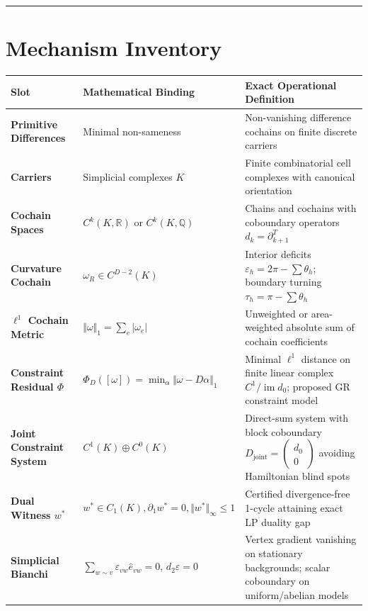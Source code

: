 \documentclass[11pt]{article}
\begin{document}
\medskip\hrule\medskip
\section{\texorpdfstring{Mechanism Inventory}{Mechanism Inventory}}

\begin{small}
\begin{longtable}{>{\raggedright\arraybackslash}p{}>{\raggedright\arraybackslash}p{}>{\raggedright\arraybackslash}p{}}
\toprule
Slot & Mathematical Binding & Exact Operational Definition \\
\midrule
\textbf{Primitive Differences} & Minimal non-sameness & Non-vanishing difference cochains on finite discrete carriers \\
\addlinespace[0.25em]
\textbf{Carriers} & Simplicial complexes $K$ & Finite combinatorial cell complexes with canonical orientation \\
\addlinespace[0.25em]
\textbf{Cochain Spaces} & $C^k(K, \mathbb{R})$ or $C^k(K, \mathbb{Q})$ & Chains and cochains with coboundary operators $d_k = \partial_{k+1}^T$ \\
\addlinespace[0.25em]
\textbf{Curvature Cochain} & $\omega_R \in C^{D-2}(K)$ & Interior deficits $\varepsilon_h = 2\pi - \sum \theta_h$; boundary turning $\tau_h = \pi - \sum \theta_h$ \\
\addlinespace[0.25em]
\textbf{$\ell^1$ Cochain Metric} & $\Vert \omega \Vert_1 = \sum_e \lvert \omega_e \rvert$ & Unweighted or area-weighted absolute sum of cochain coefficients \\
\addlinespace[0.25em]
\textbf{Constraint Residual $\Phi$} & $\Phi_D([\omega]) = \min_{\alpha} \Vert \omega - D \alpha \Vert_1$ & Minimal $\ell^1$ distance on finite linear complex $C^1 / \operatorname{im} d_0$; proposed GR constraint model \\
\addlinespace[0.25em]
\textbf{Joint Constraint System} & $C^1(K) \oplus C^0(K)$ & Direct-sum system with block coboundary $D_{\mathrm{joint}} = \begin{pmatrix} d_0 \\ 0 \end{pmatrix}$ avoiding Hamiltonian blind spots \\
\addlinespace[0.25em]
\textbf{Dual Witness $w^*$} & $w^* \in C_1(K), \partial_1 w^* = 0, \Vert w^* \Vert_\infty \le 1$ & Certified divergence-free 1-cycle attaining exact LP duality gap \\
\addlinespace[0.25em]
\textbf{Simplicial Bianchi} & $\sum_{w \sim v} \varepsilon_{vw} \hat{e}_{vw} = 0$, $d_2 \varepsilon = 0$ & Vertex gradient vanishing on stationary backgrounds; scalar coboundary on uniform/abelian models \\

\end{longtable}
\end{small}
\end{document}
